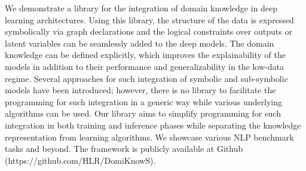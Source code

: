 We demonstrate a library for the integration of domain knowledge in deep learning architectures. Using this library, the structure of the data is expressed symbolically via graph declarations and the logical constraints over outputs or latent variables can be seamlessly added to the deep models. The domain knowledge can be defined explicitly, which improves the explainability of the models in addition to their performance and generalizability in the low-data regime. Several approaches for such integration of symbolic and sub-symbolic models have been introduced; however, there is no library to facilitate the programming for such integration in a generic way while various underlying algorithms can be used.
Our library aims to simplify programming for such integration in both training and inference phases while separating the knowledge representation from learning algorithms. We showcase various NLP benchmark tasks and beyond. The framework is publicly available at Github (https://github.com/HLR/DomiKnowS).